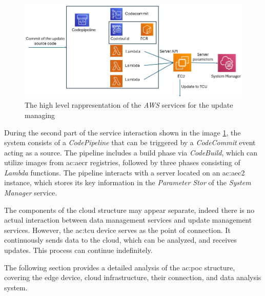 \begin{figure}[h]  %
    \centering
    \includegraphics[width=1\textwidth]{images/AWS_update_services.png}  %
    \caption{The high level rappresentation of the \textit{AWS} services for the update managing}
    \label{fig:AWSUpdateServices}
\end{figure}
During the second part of the service interaction shown in the image \ref{fig:AWSUpdateServices}, the system consists of a \textit{CodePipeline} that can be triggered by a \textit{CodeCommit} event acting as a source. The pipeline includes a build phase via \textit{CodeBuild}, which can utilize images from \gls{ac:aecr} registries, followed by three phases consisting of \textit{Lambda} functions. The pipeline interacts with a server located on an \gls{ac:aec2} instance, which stores its key information in the \textit{Parameter Stor} of the \textit{System Manager} service.

The components of the cloud structure may appear separate, indeed there is no actual interaction between data management services and update management services. However, the \gls{ac:tcu} device serves as the point of connection. It continuously sends data to the cloud, which can be analyzed, and receives updates. This process can continue indefinitely.

The following section provides a detailed analysis of the \gls{ac:poc} structure, covering the edge device, cloud infrastructure, their connection, and data analysis system.